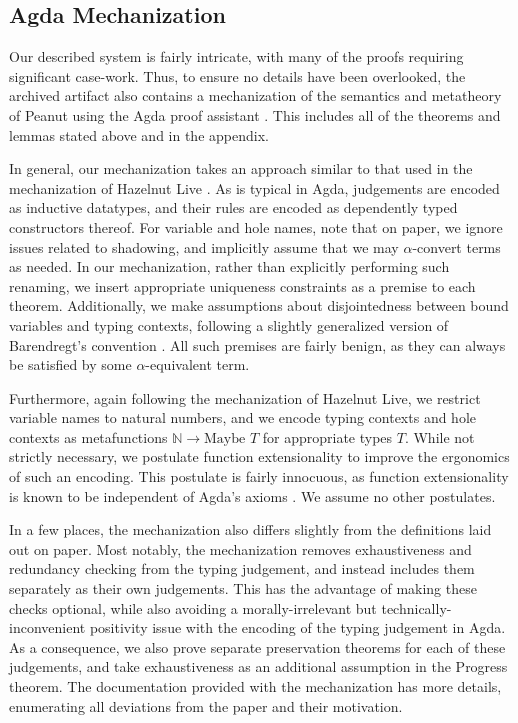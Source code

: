 \subsection{Agda Mechanization}
\label{sec:agda}

Our described system is fairly intricate, with many of the proofs requiring significant case-work. Thus, to ensure no details have been overlooked, the archived artifact also contains a mechanization of the semantics and metatheory of Peanut using the Agda proof assistant \cite{norell:thesis}. This includes all of the theorems and lemmas stated above and in the appendix. 

In general, our mechanization takes an approach similar to that used in the mechanization of Hazelnut Live \cite{DBLP:journals/pacmpl/OmarVCH19}. As is typical in Agda, judgements are encoded as inductive datatypes, and their rules are encoded as dependently typed constructors thereof. For variable and hole names, note that on paper, we ignore issues related to shadowing, and implicitly assume that we may $\alpha$-convert terms as needed. In our mechanization, rather than explicitly performing such renaming, we insert appropriate uniqueness constraints as a premise to each theorem. Additionally, we make assumptions about disjointedness between bound variables and typing contexts, following a slightly generalized version of Barendregt’s convention \cite{DBLP:books/daglib/0067558, DBLP:conf/cade/UrbanBN07}. All such premises are fairly benign, as they can always be satisfied by some $\alpha$-equivalent term.

Furthermore, again following the mechanization of Hazelnut Live, we restrict variable names to natural numbers, and we encode typing contexts and hole contexts as metafunctions $\mathbb{N} \to \text{Maybe } T$ for appropriate types $T$. While not strictly necessary, we postulate function extensionality to improve the ergonomics of such an encoding. This postulate is fairly innocuous, as function extensionality is known to be independent of Agda’s axioms \cite{DBLP:conf/lics/AwodeyGS12}. We assume no other postulates.

In a few places, the mechanization also differs slightly from the definitions laid out on paper. Most notably, the mechanization removes exhaustiveness and redundancy checking from the typing judgement, and instead includes them separately as their own judgements. This has the advantage of making these checks optional, while also avoiding a morally-irrelevant but technically-inconvenient positivity issue with the encoding of the typing judgement in Agda. As a consequence, we also prove separate preservation theorems for each of these judgements, and take exhaustiveness as an additional assumption in the Progress theorem. The documentation provided with the mechanization has more details, enumerating all deviations from the paper and their motivation.